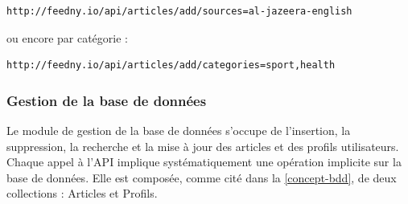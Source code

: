 \begin{lstlisting}[style=api] 
http://feedny.io/api/articles/add/sources=al-jazeera-english
\end{lstlisting}

ou encore par catégorie :
\begin{lstlisting}[style=api] 
http://feedny.io/api/articles/add/categories=sport,health
\end{lstlisting}  

\subsubsection{Gestion de la base de données}
Le module de gestion de la base de données s'occupe de l'insertion, la suppression, la recherche et la mise à jour des articles et des profils utilisateurs. Chaque appel à l'API implique systématiquement une opération implicite sur la base de données. Elle est composée, comme cité dans la \autoref{concept-bdd}, de deux collections : Articles et Profils. 

